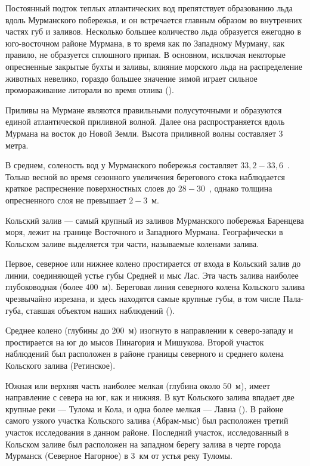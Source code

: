 
Постоянный подток теплых атлантических вод препятствует образованию льда вдоль Мурманского побережья, и он встречается главным образом во внутренних частях губ и заливов.
Несколько большее количество льда образуется ежегодно в юго-восточном районе Мурмана, в то время как по Западному Мурману, как правило, не образуется сплошного припая. 
В основном, исключая некоторые опресненные закрытые бухты и заливы, влияние морского льда на распределение животных невелико, гораздо большее значение зимой играет сильное промораживание литорали во время отлива (\cite{Propp_1971}).

Приливы на Мурмане являются правильными полусуточными и образуются единой атлантической приливной волной. 
Далее она распространяется вдоль Мурмана на восток до Новой Земли. 
Высота приливной волны составляет $3$ метра. 

В среднем, соленость вод у Мурманского побережья составляет $33,2 - 33,6$~\permil. 
Только весной во время сезонного увеличения берегового стока наблюдается краткое распреснение поверхностных слоев до $28 - 30$~\permil, однако толщина опресненного слоя не превышает $2 - 3$~м.

Кольский залив --- самый крупный из заливов Мурманского побережья Баренцева моря, лежит на границе Восточного и Западного Мурмана.
Географически в Кольском заливе выделяется три части, называемые коленами залива. 

Первое, северное или нижнее колено простирается от входа в Кольский залив до линии, соединяющей устье губы Средней и мыс Лас. 
Эта часть залива наиболее глубоководная (более $400$~м). 
Береговая линия северного колена Кольского залива чрезвычайно изрезана, и  здесь находятся самые крупные губы, в том числе Пала-губа, ставшая объектом наших наблюдений (\cite{Derugin_1915}).


Среднее колено (глубины до $200$~м) изогнуто в направлении к северо-западу и простирается на юг до мысов Пинагория и Мишукова. 
Второй участок наблюдений был расположен в районе границы северного и среднего колена Кольского залива (Ретинское).

Южная или верхняя часть наиболее мелкая (глубина около $50$~м), имеет направление с севера на юг, как и нижняя. 
В кут Кольского залива впадает две крупные реки --- Тулома и Кола, и одна более мелкая --- Лавна (\cite{Derugin_1915}).  
В районе самого узкого участка Кольского залива (Абрам-мыс) был расположен третий участок исследования в данном районе.
Последний участок, исследованный в Кольском заливе был расположен на западном берегу залива в черте города Мурманск (Северное Нагорное) в $3$~км от устья реку Туломы.

